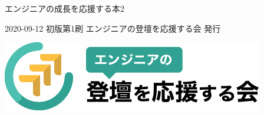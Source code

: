 \clearpage{\thispagestyle{empty}}
\begin{center}

\vspace{340pt}

\begin{sffamily}
\Huge
エンジニアの成長を応援する本2
\normalsize
\end{sffamily}
\vspace{400pt}

\begin{sffamily}
2020-09-12
\hspace{5pt}
初版第1刷
\hspace{5pt}
エンジニアの登壇を応援する会
\hspace{5pt}
発行
\end{sffamily}
\vspace{80pt}

\includegraphics[width=0.3\linewidth]{images/engineers_lt.png}

\end{center}
